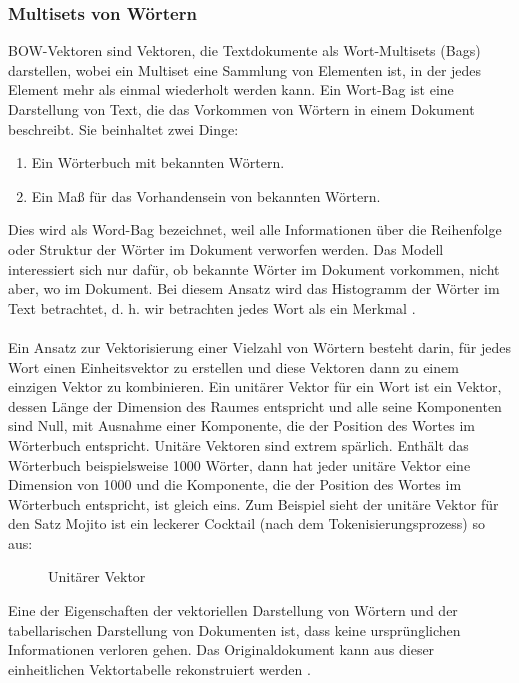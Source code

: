 \subsubsection{Multisets von Wörtern}
\ac{BOW}-Vektoren sind Vektoren, die Textdokumente als Wort-Multisets (Bags) darstellen, wobei ein Multiset eine Sammlung von Elementen ist, in der jedes Element mehr als einmal wiederholt werden kann. 
Ein Wort-Bag ist eine Darstellung von Text, die das Vorkommen von Wörtern in einem Dokument beschreibt. 
Sie beinhaltet zwei Dinge:
\begin{enumerate}
    \item Ein Wörterbuch mit bekannten Wörtern.
    \item Ein Maß für das Vorhandensein von bekannten Wörtern.
\end{enumerate}
Dies wird als \glqq{}Word-Bag\grqq{} bezeichnet, weil alle Informationen über die Reihenfolge oder Struktur der Wörter im Dokument verworfen werden. 
Das Modell interessiert sich nur dafür, ob bekannte Wörter im Dokument vorkommen, nicht aber, wo im Dokument. 
Bei diesem Ansatz wird das Histogramm der Wörter im Text betrachtet, d. h. wir betrachten jedes Wort als ein Merkmal \cite{goldberg_neural_2017}.\\\\
Ein Ansatz zur Vektorisierung einer Vielzahl von Wörtern besteht darin, für jedes Wort einen Einheitsvektor zu erstellen und diese Vektoren dann zu einem einzigen Vektor zu kombinieren. 
Ein unitärer Vektor für ein Wort ist ein Vektor, dessen Länge der Dimension des Raumes entspricht und alle seine Komponenten sind Null, mit Ausnahme einer Komponente, die der Position des Wortes im Wörterbuch entspricht. Unitäre Vektoren sind extrem spärlich. 
Enthält das Wörterbuch beispielsweise 1000 Wörter, dann hat jeder unitäre Vektor eine Dimension von 1000 und die Komponente, die der Position des Wortes im Wörterbuch entspricht, ist gleich eins.
Zum Beispiel sieht der unitäre Vektor für den Satz \glqq Mojito ist ein leckerer Cocktail\grqq{} (nach dem Tokenisierungsprozess) so aus:
\begin{figure}[H]
    \centering
    \caption{\label{figure:Unitaere_Vektoe}Unitärer Vektor}
\end{figure}
\noindent
Eine der Eigenschaften der vektoriellen Darstellung von Wörtern und der tabellarischen Darstellung von Dokumenten ist, dass keine ursprünglichen Informationen verloren gehen. 
Das Originaldokument kann aus dieser einheitlichen Vektortabelle rekonstruiert werden \cite{bird_natural_2009}.
